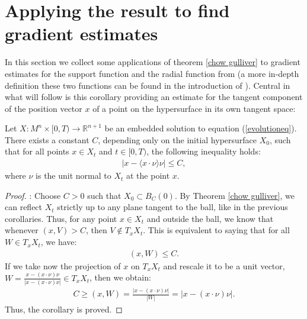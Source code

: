 \section{Applying the result to find gradient estimates}\label{Applying the result to find gradient estimates}

In this section we collect some applications of theorem \ref{chow gulliver} to gradient estimates for the support function and the radial function from \cite{Chow} (a more in-depth definition these two functions can be found in the introduction of \cite{tomography}). Central in what will follow is this corollary providing an estimate for the tangent component of the position vector $x$ of a point on the hypersurface in its own tangent space: 
\begin{cor}
	Let $ X : M^n \times [0, T) \to \mathbb{R}^{n+1} $ be an embedded solution to equation (\ref{evolutioneq}). There exists a constant $ C $, depending only on the initial hypersurface $ X_0 $, such that for all points $ x \in X_t $ and $ t \in [0, T) $, the following inequality holds:
	\begin{align*}
		| x - \langle x \cdot \nu\rangle \nu | \leq C,
	\end{align*}
	where $ \nu $ is the unit normal to $ X_t $ at the point $ x $.
	\label{x projection estimate}
\end{cor}


\begin{proof}: 
	Choose $ C > 0 $ such that $ X_0 \subset B_C(0) $. By Theorem \ref{chow gulliver}, we can reflect $ X_t $ strictly up to any plane tangent to the ball, like in the previous corollaries.	
	Thus, for any point $ x \in X_t $ and outside the ball, we know that whenever $ (x, V) > C $, then $ V \notin T_x X_t $.
	This is equivalent to saying that for all $ W \in T_x X_t $, we have:
	\begin{align*}
		(x, W) \leq C.
	\end{align*}
	If we take now the projection of $x$ on $T_x X_t$ and rescale it to be a unit vector, $ W = \frac{x - (x \cdot \nu) \nu}{|x - (x \cdot \nu) \nu|} \in T_x X_t $, then we obtain:
	\begin{align*}
		C \geq (x, W) = \frac{|x - (x \cdot \nu) \nu|}{|W|} = |x - (x \cdot \nu) \nu|.
	\end{align*}	
	Thus, the corollary is proved.
\end{proof}


